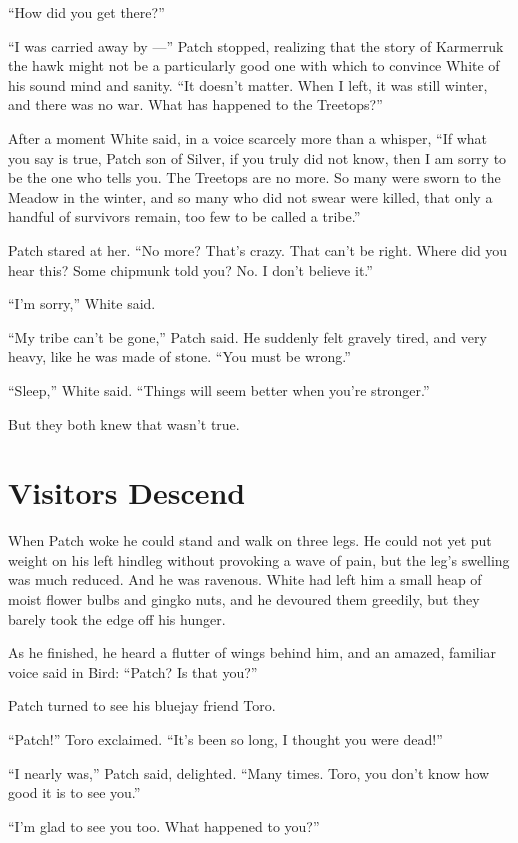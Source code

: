 \documentclass[ebook,oneside,openany,12pt]{memoir}
\begin{document}
“How did you get there?”

“I was carried away by —” Patch stopped, realizing that the story of
Karmerruk the hawk might not be a particularly good one with which to
convince White of his sound mind and sanity. “It doesn’t matter. When
I left, it was still winter, and there was no war. What has happened
to the Treetops?”

After a moment White said, in a voice scarcely more than a whisper,
“If what you say is true, Patch son of Silver, if you truly did not
know, then I am sorry to be the one who tells you. The Treetops are no
more. So many were sworn to the Meadow in the winter, and so many who
did not swear were killed, that only a handful of survivors remain,
too few to be called a tribe.”

Patch stared at her. “No more? That’s crazy. That can’t be
right. Where did you hear this? Some chipmunk told you? No. I don’t
believe it.”

“I’m sorry,” White said.

“My tribe can’t be gone,” Patch said. He suddenly felt gravely tired,
and very heavy, like he was made of stone. “You must be wrong.”

“Sleep,” White said. “Things will seem better when you’re stronger.”

But they both knew that wasn’t true.


\section{Visitors Descend}

When Patch woke he could stand and walk on three legs. He could not
yet put weight on his left hindleg without provoking a wave of pain,
but the leg’s swelling was much reduced. And he was ravenous. White
had left him a small heap of moist flower bulbs and gingko nuts, and
he devoured them greedily, but they barely took the edge off his
hunger.

As he finished, he heard a flutter of wings behind him, and an amazed,
familiar voice said in Bird: “Patch? Is that you?”

Patch turned to see his bluejay friend Toro.

“Patch!” Toro exclaimed. “It’s been so long, I thought you were dead!”

“I nearly was,” Patch said, delighted. “Many times. Toro, you don’t
know how good it is to see you.”

“I’m glad to see you too. What happened to you?”
\end{document}
